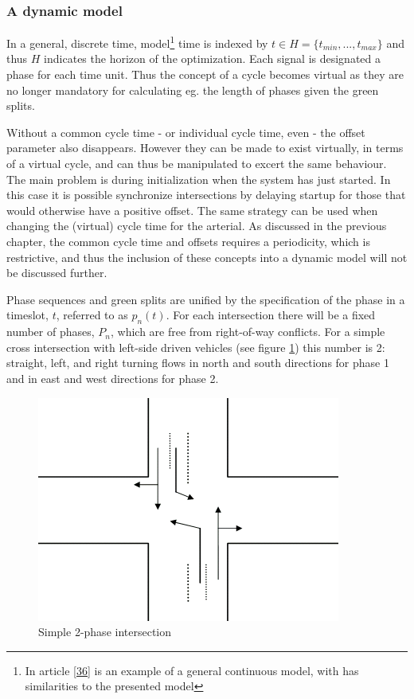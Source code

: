 \subsubsection*{A dynamic model}
\label{dynamicmodel}
In a general, discrete time, model\footnote{In article \ref{36} is an example of a general continuous model, with has similarities to the presented model} time is indexed by $t \in H = \lbrace t_{min},...,t_{max} \rbrace$ and thus $H$ indicates the horizon of the optimization. Each signal is designated a phase for each time unit. Thus the concept of a cycle becomes virtual as they are no longer mandatory for calculating eg. the length of phases given the green splits.

Without a common cycle time - or individual cycle time, even - the offset parameter also disappears. However they can be made to exist virtually, in terms of a virtual cycle, and can thus be manipulated to excert the same behaviour. 
The main problem is during initialization when the system has just started. In this case it is possible synchronize intersections by delaying startup for those that would otherwise have a positive offset. The same strategy can be used when changing the (virtual) cycle time for the arterial. As discussed in the previous chapter, the common cycle time and offsets requires a periodicity, which is restrictive, and thus the inclusion of these concepts into a dynamic model will not be discussed further.

Phase sequences and green splits are unified by the specification of the phase in a timeslot, $t$, referred to as $p_n(t)$. For each intersection there will be a fixed number of phases, $P_n$, which are free from right-of-way conflicts. For a simple cross intersection with left-side driven vehicles (see figure \ref{fig:simple_intersection}) this number is 2: straight, left, and right turning flows in north and south directions for phase 1 and in east and west directions for phase 2.

\begin{figure}[!ht]
\begin{center}
\includegraphics[scale=0.4]{simple_intersection.png} 
\end{center}
\caption{Simple 2-phase intersection}
\label{fig:simple_intersection}
\end{figure}

